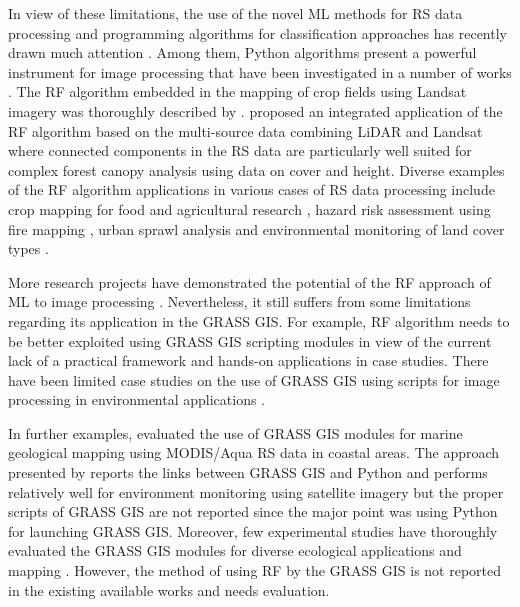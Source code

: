 \documentclass{elektr}
\begin{document}
In view of these limitations, the use of the novel ML methods for RS data processing and programming algorithms for classification approaches has recently drawn much attention \cite{Ayhan}. Among them, Python algorithms present a powerful instrument for image processing that have been investigated in a number of works \cite{9884244,9883588,Lemenkova202227,9006205,7724471}. The RF algorithm embedded in the mapping of crop fields using Landsat imagery was thoroughly described by \cite{LUCIANO2021106063}. \cite{AHMED201589} proposed an integrated application of the RF algorithm based on the multi-source data combining LiDAR and Landsat where connected components in the RS data are particularly well suited for complex forest canopy analysis using data on cover and height. Diverse examples of the RF algorithm applications in various cases of RS data processing include crop mapping for food and agricultural research \cite{OLIPHANT2019110,TELUGUNTLA2018325}, hazard risk assessment using fire mapping \cite{COLLINS2020111839}, urban sprawl analysis \cite{GHOSH201431} and environmental monitoring of land cover types \cite{MELVILLE201846,GRINAND201368}. 

More research projects have demonstrated the potential of the RF approach of ML to image processing \cite{COLLINS2020111839,WEI2020112005,WANG202294}. Nevertheless, it still suffers from some limitations regarding its application in the GRASS GIS. For example, RF algorithm needs to be better exploited using GRASS GIS scripting modules in view of the current lack of a practical framework and hands-on applications in case studies. There have been limited case studies on the use of GRASS GIS using scripts for image processing in environmental applications \cite{STRIGARO201668,geomatics5010005,ROCCHINI2017166,7326254}. 

In further examples, \cite{7326254} evaluated the use of GRASS GIS modules for marine geological mapping using MODIS/Aqua RS data in coastal areas. The approach presented by \cite{6407912} reports the links between GRASS GIS and Python and performs relatively well for environment monitoring using satellite imagery but the proper scripts of GRASS GIS are not reported since the major point was using Python for launching GRASS GIS. Moreover, few experimental studies have thoroughly evaluated the GRASS GIS modules for diverse ecological applications and mapping \cite{lemenkova2024exploitation}. However, the method of using RF by the GRASS GIS is not reported in the existing available works and needs evaluation. 
\end{document}
